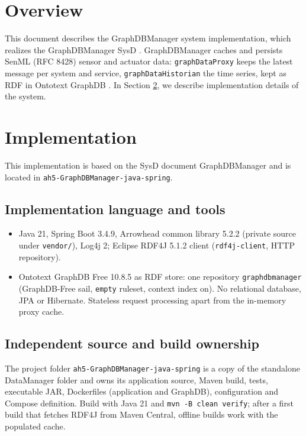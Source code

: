 \documentclass[a4paper]{arrowhead}
\begin{document}
\section{Overview}
\label{sec:overview}

This document describes the GraphDBManager system implementation, which realizes the GraphDBManager SysD \cite{gdm-sysd}. GraphDBManager caches and persists SenML (RFC 8428) sensor and actuator data: \texttt{graphDataProxy} keeps the latest message per system and service, \texttt{graphDataHistorian} the time series, kept as RDF in Ontotext GraphDB \cite{graphdb}.
In Section \ref{Implementation}, we describe implementation details of the system.

\newpage

\section{Implementation}
\label{Implementation}

This implementation is based on the SysD document GraphDBManager \cite{gdm-sysd} and is located in \texttt{ah5-GraphDBManager-java-spring}.

\subsection{Implementation language and tools}
\begin{itemize}
\item Java 21, Spring Boot 3.4.9, Arrowhead common library 5.2.2 (private source under \texttt{vendor/}), Log4j 2; Eclipse RDF4J 5.1.2 client \cite{rdf4j} (\texttt{rdf4j-\allowbreak{}client}, HTTP repository).
\item Ontotext GraphDB Free 10.8.5 \cite{graphdb} as RDF store: one repository \texttt{graphdbmanager} (GraphDB-Free sail, \texttt{empty} ruleset, context index on). No relational database, JPA or Hibernate. Stateless request processing apart from the in-memory proxy cache.
\end{itemize}

\subsection{Independent source and build ownership}
The project folder \texttt{ah5-\allowbreak{}GraphDBManager-\allowbreak{}java-\allowbreak{}spring} is a copy of the standalone DataManager folder \cite{dm-sysd-ref} and owns its application source, Maven build, tests, executable JAR, Dockerfiles (application and GraphDB), configuration and Compose definition. Build with Java 21 and \texttt{mvn -B clean verify}; after a first build that fetches RDF4J from Maven Central, offline builds work with the populated cache.
\end{document}
